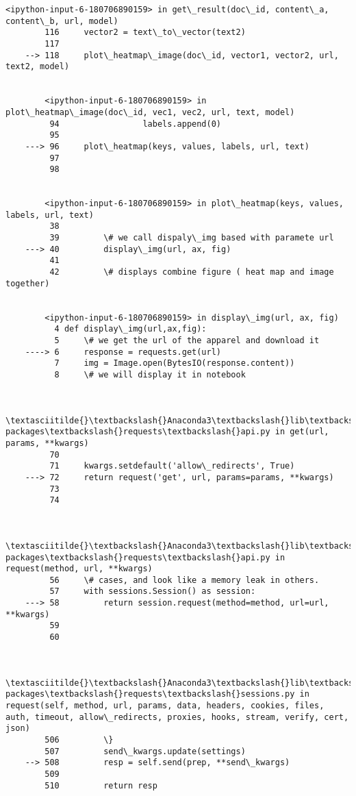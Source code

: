\documentclass[11pt]{article}
\begin{document}
\begin{Verbatim}[commandchars=\\\{\}]
        <ipython-input-6-180706890159> in get\_result(doc\_id, content\_a, content\_b, url, model)
        116     vector2 = text\_to\_vector(text2)
        117 
    --> 118     plot\_heatmap\_image(doc\_id, vector1, vector2, url, text2, model)
    

        <ipython-input-6-180706890159> in plot\_heatmap\_image(doc\_id, vec1, vec2, url, text, model)
         94                 labels.append(0)
         95 
    ---> 96     plot\_heatmap(keys, values, labels, url, text)
         97 
         98 
    

        <ipython-input-6-180706890159> in plot\_heatmap(keys, values, labels, url, text)
         38 
         39         \# we call dispaly\_img based with paramete url
    ---> 40         display\_img(url, ax, fig)
         41 
         42         \# displays combine figure ( heat map and image together)
    

        <ipython-input-6-180706890159> in display\_img(url, ax, fig)
          4 def display\_img(url,ax,fig):
          5     \# we get the url of the apparel and download it
    ----> 6     response = requests.get(url)
          7     img = Image.open(BytesIO(response.content))
          8     \# we will display it in notebook
    

        \textasciitilde{}\textbackslash{}Anaconda3\textbackslash{}lib\textbackslash{}site-packages\textbackslash{}requests\textbackslash{}api.py in get(url, params, **kwargs)
         70 
         71     kwargs.setdefault('allow\_redirects', True)
    ---> 72     return request('get', url, params=params, **kwargs)
         73 
         74 
    

        \textasciitilde{}\textbackslash{}Anaconda3\textbackslash{}lib\textbackslash{}site-packages\textbackslash{}requests\textbackslash{}api.py in request(method, url, **kwargs)
         56     \# cases, and look like a memory leak in others.
         57     with sessions.Session() as session:
    ---> 58         return session.request(method=method, url=url, **kwargs)
         59 
         60 
    

        \textasciitilde{}\textbackslash{}Anaconda3\textbackslash{}lib\textbackslash{}site-packages\textbackslash{}requests\textbackslash{}sessions.py in request(self, method, url, params, data, headers, cookies, files, auth, timeout, allow\_redirects, proxies, hooks, stream, verify, cert, json)
        506         \}
        507         send\_kwargs.update(settings)
    --> 508         resp = self.send(prep, **send\_kwargs)
        509 
        510         return resp
    


\end{Verbatim}
\end{document}
